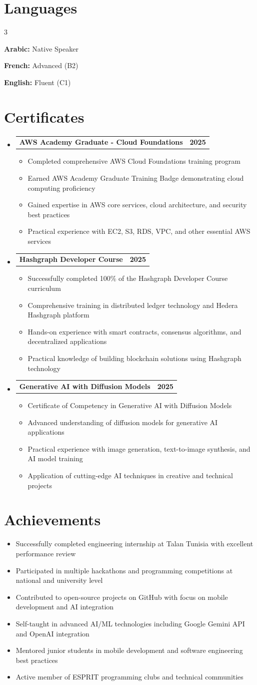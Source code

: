 \documentclass[letterpaper,11pt]{article}
\makeatletter
\newcommand{\resumeItem}[1]{
  \item\small{#1 \vspace{1pt}}
}
\newcommand{\resumeProjectHeading}[2]{
    \item
    \begin{tcolorbox}[
      colback=white,
      colframe=accent,
      boxrule=0.5pt,
      arc=3pt,
      left=6pt,
      right=6pt,
      top=3pt,
      bottom=3pt
    ]
      \begin{tabular*}{\textwidth}{l@{\extracolsep{\fill}}r}
        \textbf{\color{darkgray}#1} & \textbf{\small \color{mediumgray}#2}\\
      \end{tabular*}
    \end{tcolorbox}
    \vspace{-6pt}
}
\newcommand{\skillCategory}[2]{
  \begin{skillbox}
    \textbf{\color{secondary}#1:} \color{darkgray}#2
  \end{skillbox}
  \vspace{3pt}
}
\newcommand{\resumeSubHeadingListStart}{\begin{itemize}[leftmargin=0.0in, label={}]}
\newcommand{\resumeSubHeadingListEnd}{\end{itemize}}
\newcommand{\resumeItemListStart}{\begin{itemize}[leftmargin=0.15in]}
\newcommand{\resumeItemListEnd}{\end{itemize}\vspace{2pt}}
\makeatother
\begin{document}
\section{Languages}
\begin{multicols}{3}
\skillCategory{Arabic}{Native Speaker}
\skillCategory{French}{Advanced (B2)}
\skillCategory{English}{Fluent (C1)}
\end{multicols}

\section{Certificates}
\resumeSubHeadingListStart
  \resumeProjectHeading
    {\textbf{AWS Academy Graduate - Cloud Foundations}}{2025}
    \resumeItemListStart
      \resumeItem{Completed comprehensive AWS Cloud Foundations training program}
      \resumeItem{Earned AWS Academy Graduate Training Badge demonstrating cloud computing proficiency}
      \resumeItem{Gained expertise in AWS core services, cloud architecture, and security best practices}
      \resumeItem{Practical experience with EC2, S3, RDS, VPC, and other essential AWS services}
    \resumeItemListEnd

  \resumeProjectHeading
    {\textbf{Hashgraph Developer Course}}{2025}
    \resumeItemListStart
      \resumeItem{Successfully completed 100\% of the Hashgraph Developer Course curriculum}
      \resumeItem{Comprehensive training in distributed ledger technology and Hedera Hashgraph platform}
      \resumeItem{Hands-on experience with smart contracts, consensus algorithms, and decentralized applications}
      \resumeItem{Practical knowledge of building blockchain solutions using Hashgraph technology}
    \resumeItemListEnd

  \resumeProjectHeading
    {\textbf{Generative AI with Diffusion Models}}{2025}
    \resumeItemListStart
      \resumeItem{Certificate of Competency in Generative AI with Diffusion Models}
      \resumeItem{Advanced understanding of diffusion models for generative AI applications}
      \resumeItem{Practical experience with image generation, text-to-image synthesis, and AI model training}
      \resumeItem{Application of cutting-edge AI techniques in creative and technical projects}
    \resumeItemListEnd
\resumeSubHeadingListEnd

\section{Achievements}
\resumeSubHeadingListStart
  \resumeItem{Successfully completed engineering internship at Talan Tunisia with excellent performance review}
  \resumeItem{Participated in multiple hackathons and programming competitions at national and university level}
  \resumeItem{Contributed to open-source projects on GitHub with focus on mobile development and AI integration}
  \resumeItem{Self-taught in advanced AI/ML technologies including Google Gemini API and OpenAI integration}
  \resumeItem{Mentored junior students in mobile development and software engineering best practices}
  \resumeItem{Active member of ESPRIT programming clubs and technical communities}
\resumeSubHeadingListEnd
\end{document}
